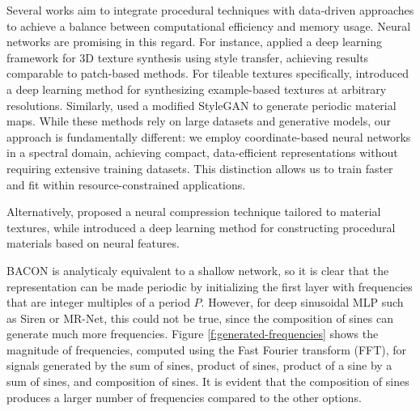 Several works aim to integrate procedural techniques with data-driven approaches to achieve a balance between computational efficiency and memory usage. Neural networks are promising in this regard. For instance, \citet{Gutierrez-2019} applied a deep learning framework for 3D texture synthesis using style transfer, achieving results comparable to patch-based methods. For tileable textures specifically, \citet{deeptile} introduced a deep learning method for synthesizing example-based textures at arbitrary resolutions. Similarly, \citet{zhou2022tilegen} used a modified StyleGAN to generate periodic material maps. While these methods rely on large datasets and generative models, our approach is fundamentally different: we employ coordinate-based neural networks in a spectral domain, achieving compact, data-efficient representations without requiring extensive training datasets. This distinction allows us to train faster and fit within resource-constrained applications.


Alternatively, \citet{ntc2023} proposed a neural compression technique tailored to material textures, while \citet{match} introduced a deep learning method for constructing procedural materials based on neural features. 


BACON \citep{bacon2021} is analyticaly equivalent to a shallow network, so it is clear that the representation can be made periodic by initializing the first layer with frequencies that are integer multiples of a period $P$. However, for deep sinusoidal MLP such as Siren \cite{sitzmann2019siren} or MR-Net, this could not be true, since the composition of sines can generate much more frequencies. Figure \ref{f:generated-frequencies} shows the magnitude of frequencies, computed using the Fast Fourier transform (FFT), for signals generated by the sum of sines, product of sines, product of a sine by a sum of sines, and composition of sines. It is evident that the composition of sines produces a larger number of frequencies compared to the other options.


